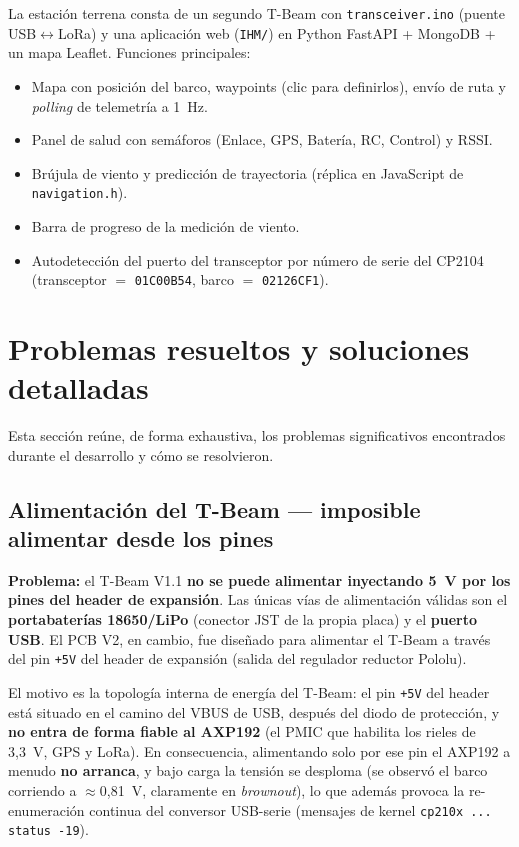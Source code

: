 \documentclass[12pt,a4paper]{article}
\newcommand{\file}[1]{\texttt{#1}}
\begin{document}
La estaci\'on terrena consta de un segundo T-Beam con \file{transceiver.ino}
(puente USB$\leftrightarrow$LoRa) y una aplicaci\'on web (\file{IHM/}) en Python
FastAPI + MongoDB + un mapa Leaflet. Funciones principales:

\begin{itemize}
  \item Mapa con posici\'on del barco, waypoints (clic para definirlos), env\'io de
    ruta y \emph{polling} de telemetr\'ia a 1~Hz.
  \item Panel de salud con sem\'aforos (Enlace, GPS, Bater\'ia, RC, Control) y RSSI.
  \item Br\'ujula de viento y predicci\'on de trayectoria (r\'eplica en JavaScript
    de \file{navigation.h}).
  \item Barra de progreso de la medici\'on de viento.
  \item Autodetecci\'on del puerto del transceptor por n\'umero de serie del
    CP2104 (transceptor $=$ \texttt{01C00B54}, barco $=$ \texttt{02126CF1}).
\end{itemize}

\section{Problemas resueltos y soluciones detalladas}

Esta secci\'on re\'une, de forma exhaustiva, los problemas significativos
encontrados durante el desarrollo y c\'omo se resolvieron.

\subsection{Alimentaci\'on del T-Beam --- imposible alimentar desde los pines}
\label{sec:alim}

\begin{warningbox}
  \textbf{Problema:} el T-Beam V1.1 \textbf{no se puede alimentar
  inyectando 5~V por los pines del header de expansi\'on}. Las \'unicas v\'ias de
  alimentaci\'on v\'alidas son el \textbf{portabater\'ias 18650/LiPo} (conector
  JST de la propia placa) y el \textbf{puerto USB}. El PCB V2, en cambio, fue
  dise\~nado para alimentar el T-Beam a trav\'es del pin \texttt{+5V} del header de
  expansi\'on (salida del regulador reductor Pololu).

  El motivo es la topolog\'ia interna de energ\'ia del T-Beam: el pin \texttt{+5V}
  del header est\'a situado en el camino del VBUS de USB, despu\'es del diodo de
  protecci\'on, y \textbf{no entra de forma fiable al AXP192} (el PMIC que habilita
  los rieles de 3,3~V, GPS y LoRa). En consecuencia, alimentando solo por ese pin
  el AXP192 a menudo \textbf{no arranca}, y bajo carga la tensi\'on se desploma
  (se observ\'o el barco corriendo a $\approx$0,81~V, claramente en
  \emph{brownout}), lo que adem\'as provoca la re-enumeraci\'on continua del
  conversor USB-serie (mensajes de kernel \texttt{cp210x ... status -19}).
\end{warningbox}
\end{document}
